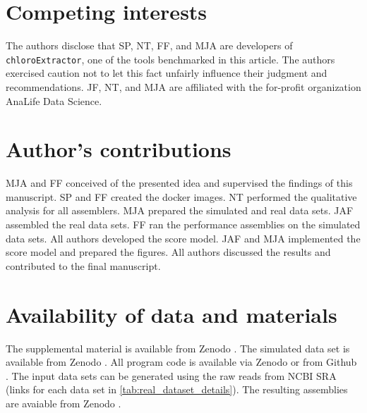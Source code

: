 \documentclass{bmcart}
\newcommand{\formatprogramnames}[1]{\texttt{#1}}
\newcommand{\ce}{\formatprogramnames{chloroExtractor}}
\begin{document}
\begin{backmatter}

\section*{Competing interests}
The authors disclose that SP, NT, FF, and MJA are developers of \ce{}, one of the tools benchmarked in this article.
The authors exercised caution not to let this fact unfairly influence their judgment and recommendations.
JF, NT, and MJA are affiliated with the for-profit organization AnaLife Data Science.

\section*{Author's contributions}
MJA and FF conceived of the presented idea and supervised the findings of this manuscript.
SP and FF created the docker images.
NT performed the qualitative analysis for all assemblers.
MJA prepared the simulated and real data sets.
JAF assembled the real data sets.
FF ran the performance assemblies on the simulated data sets.
All authors developed the score model.
JAF and MJA implemented the score model and prepared the figures.
All authors discussed the results and contributed to the final manuscript.

\section*{Availability of data and materials}
The supplemental material is available from Zenodo \cite{zenodosupplement}. The simulated data set is available from Zenodo \cite{zenododataset}. All program code is available via Zenodo \cite{zenodorepo} or from Github \cite{github-benchmark-repo}. The input data sets can be generated using the raw reads from NCBI SRA (links for each data set in \cref{tab:real_dataset_details}). The resulting assemblies are avaiable from Zenodo \cite{zenodoassemblies}.



\end{backmatter}
\end{document}
